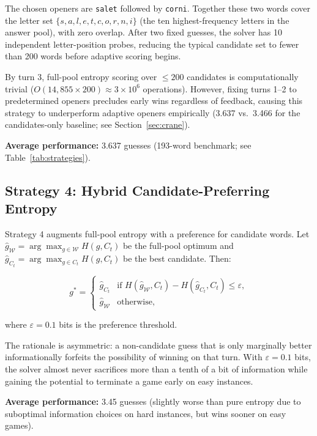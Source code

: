 \documentclass{article}
\begin{document}
The chosen openers are \texttt{salet} followed by \texttt{corni}. Together these
two words cover the letter set $\{s, a, l, e, t, c, o, r, n, i\}$ (the ten
highest-frequency letters in the answer pool), with zero overlap. After two fixed
guesses, the solver has 10 independent letter-position probes, reducing the
typical candidate set to fewer than 200 words before adaptive scoring begins.

By turn 3, full-pool entropy scoring over $\leq 200$ candidates is computationally
trivial ($O(14{,}855 \times 200) \approx 3 \times 10^6$ operations). However,
fixing turns 1--2 to predetermined openers precludes early wins regardless of
feedback, causing this strategy to underperform adaptive openers empirically
(3.637 vs.\ 3.466 for the candidates-only baseline; see Section~\ref{sec:crane}).

\textbf{Average performance:} 3.637 guesses (193-word benchmark; see Table~\ref{tab:strategies}).

\subsection{Strategy 4: Hybrid Candidate-Preferring Entropy}

Strategy 4 augments full-pool entropy with a preference for candidate words.
Let $\hat{g}_{\mathcal{W}} = \arg\max_{g \in \mathcal{W}} H(g, C_t)$ be the
full-pool optimum and $\hat{g}_{C_t} = \arg\max_{g \in C_t} H(g, C_t)$ be
the best candidate. Then:

\[
  g^* = \begin{cases}
    \hat{g}_{C_t} & \text{if } H(\hat{g}_{\mathcal{W}}, C_t) - H(\hat{g}_{C_t}, C_t) \leq \varepsilon, \\
    \hat{g}_{\mathcal{W}} & \text{otherwise,}
  \end{cases}
\]

where $\varepsilon = 0.1$ bits is the preference threshold.

The rationale is asymmetric: a non-candidate guess that is only marginally
better informationally forfeits the possibility of winning on that turn.
With $\varepsilon = 0.1$ bits, the solver almost never sacrifices more than a
tenth of a bit of information while gaining the potential to terminate a
game early on easy instances.

\textbf{Average performance:} 3.45 guesses (slightly worse than pure entropy
due to suboptimal information choices on hard instances, but wins sooner on
easy games).
\end{document}
